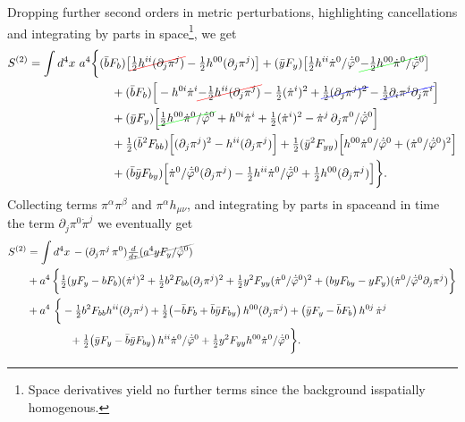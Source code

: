 Dropping further second orders in metric perturbations, highlighting cancellations and {\color{blue} integrating by parts in space}\footnote{\label{fn:integrating_parts_space_backround}Space derivatives yield no further terms since the background isspatially homogenous.}, we get
{\small\begin{align}
\begin{aligned}
    S^{(2)}=
    \int d^4x\,\, a^4 \bigg\{&
        (\bar{b}F_b) \big[\redcancel{\tfrac12h^{ii}(\partial_j \pi^j)}-\tfrac12 h^{00}(\partial_j \pi^j)\big]
        + (\bar{y}F_y) \big[\tfrac12 h^{ii} \dot{\pi}^0/\dot{\bar{\varphi}}^0\greencancel{-\tfrac12 h^{00}\dot{\pi}^0/\dot{\bar{\varphi}}^0} \big]\\
    &\quad + (\bar{b}F_b) \Big[ - h^{0 i} \dot{\pi}^i \redcancel{-\tfrac12  h^{ii}(\partial_j \pi^j)} - \tfrac12 (\dot{\pi}^i)^2 + \bluecancel{\tfrac12 (\partial_j \pi^j)^2} -\bluecancel{\tfrac12 \partial_i\pi^j\partial_j\pi^i}\Big]
    \\
    &\quad + (\bar{y}F_y) \Big[ \greencancel{\tfrac12 h^{00}\dot{\pi}^0/\dot{\bar{\varphi}}^0}+ h^{0 i} \dot{\pi}^i + \tfrac12 (\dot{\pi}^i)^2 -\dot{\pi}^j\,\partial_j\pi^0/\dot{\bar{\varphi}}^0\Big]
    \\
    &\quad + \tfrac12 (\bar{b}^2 F_{bb})\Big[ (\partial_j \pi^j)^2 - h^{ii}(\partial_j \pi^j)\Big]
    + \tfrac12 (\bar{y}^2 F_{yy})\Big[h^{00} \dot{\pi}^0/\dot{\bar{\varphi}}^0+ (\dot{\pi}^0/\dot{\bar{\varphi}}^0)^2\Big]\\
    &\quad+ (\bar{b}\bar{y} F_{by}) \Big[ \dot{\pi}^0/\dot{\bar{\varphi}}^0(\partial_j \pi^j) - \tfrac12 h^{ii}\dot{\pi}^0/\dot{\bar{\varphi}}^0 + \tfrac12 h^{00} (\partial_j\pi^j)\Big]
        \bigg\}.
\end{aligned}
\end{align}}
Collecting terms $\pi^\alpha\pi^\beta$ and $\pi^\alpha h_{\mu\nu}$, and integrating by parts in space and in time the term $\partial_j \pi^0\dot{\pi}^j$ we eventually get
{\small\begin{align}\label{eq:integrating_part_time_quadratic_action}
\begin{aligned}
    S^{(2)}&=\int d^4x\, -(\partial_j \pi^j\, \pi^{0})\graycancel{\tfrac{d}{d\tau}(a^4yF_y/\dot{\bar{\varphi}}^0)}\\
    &+a^4\,\bigg\{
    \tfrac12 (yF_y-bF_b) (\dot{\pi}^i)^2+ \tfrac12 b^2 F_{bb} (\partial_j \pi^j)^2 +\tfrac12 y^2 F_{yy} (\dot{\pi}^0/\dot{\bar{\varphi}}^0)^2+(b y F_{by}-yF_y) (\dot{\pi}^0/\dot{\bar{\varphi}}^0 \partial_j \pi^j)\bigg\}\\
    &+ a^4\,\,\bigg\{
    -\tfrac12 b^2 F_{bb} h^{ii}(\partial_j \pi^j)
    + \tfrac12\!\left(-\bar{b}F_b + \bar{b}\bar{y}F_{by}\right) h^{00}(\partial_j \pi^j)+\left(\bar{y}F_y - \bar{b}F_b\right) h^{0 j}\,\dot{\pi}^j\\
    &\qquad\qquad +\tfrac12\!\left(\bar{y}F_y - \bar{b}\bar{y}F_{by}\right) h^{ii}\dot{\pi}^0/\dot{\bar{\varphi}}^0
    + \tfrac12 y^2 F_{yy} h^{00}\dot{\pi}^0/\dot{\bar{\varphi}}^0
    \bigg\}.
\end{aligned}
\end{align}}
